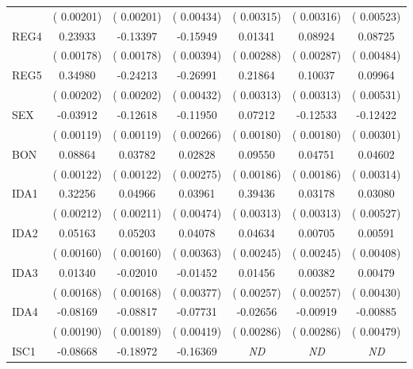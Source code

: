 {\begin{center}
\begin{table}
\begin{threeparttable}
\begin{tabular}{lcccccc}
        & \tiny{( 0.00201)} & \tiny{( 0.00201)} & \tiny{( 0.00434)} & \tiny{( 0.00315)} & \tiny{( 0.00316)} & \tiny{( 0.00523)} \\
        REG4 &  0.23933 & -0.13397 & -0.15949 &  0.01341 &  0.08924 &  0.08725 \\
        & \tiny{( 0.00178)} & \tiny{( 0.00178)} & \tiny{( 0.00394)} & \tiny{( 0.00288)} & \tiny{( 0.00287)} & \tiny{( 0.00484)} \\
        REG5 &  0.34980 & -0.24213 & -0.26991 &  0.21864 &  0.10037 &  0.09964 \\
        & \tiny{( 0.00202)} & \tiny{( 0.00202)} & \tiny{( 0.00432)} & \tiny{( 0.00313)} & \tiny{( 0.00313)} & \tiny{( 0.00531)} \\
        SEX & -0.03912 & -0.12618 & -0.11950 &  0.07212 & -0.12533 & -0.12422 \\
        & \tiny{( 0.00119)} & \tiny{( 0.00119)} & \tiny{( 0.00266)} & \tiny{( 0.00180)} & \tiny{( 0.00180)} & \tiny{( 0.00301)} \\
        BON &  0.08864 &  0.03782 &  0.02828 &  0.09550 &  0.04751 &  0.04602 \\
        & \tiny{( 0.00122)} & \tiny{( 0.00122)} & \tiny{( 0.00275)} & \tiny{( 0.00186)} & \tiny{( 0.00186)} & \tiny{( 0.00314)} \\
        IDA1 &  0.32256 &  0.04966 &  0.03961 &  0.39436 &  0.03178 &  0.03080 \\
        & \tiny{( 0.00212)} & \tiny{( 0.00211)} & \tiny{( 0.00474)} & \tiny{( 0.00313)} & \tiny{( 0.00313)} & \tiny{( 0.00527)} \\
        IDA2 &  0.05163 &  0.05203 &  0.04078 &  0.04634 &  0.00705 &  0.00591 \\
        & \tiny{( 0.00160)} & \tiny{( 0.00160)} & \tiny{( 0.00363)} & \tiny{( 0.00245)} & \tiny{( 0.00245)} & \tiny{( 0.00408)} \\
        IDA3 &  0.01340 & -0.02010 & -0.01452 &  0.01456 &  0.00382 &  0.00479 \\
        & \tiny{( 0.00168)} & \tiny{( 0.00168)} & \tiny{( 0.00377)} & \tiny{( 0.00257)} & \tiny{( 0.00257)} & \tiny{( 0.00430)} \\
        IDA4 & -0.08169 & -0.08817 & -0.07731 & -0.02656 & -0.00919 & -0.00885 \\
        & \tiny{( 0.00190)} & \tiny{( 0.00189)} & \tiny{( 0.00419)} & \tiny{( 0.00286)} & \tiny{( 0.00286)} & \tiny{( 0.00479)} \\
        ISC1 & -0.08668 & -0.18972 & -0.16369 & \textit{ND} & \textit{ND} & \textit{ND} \\

\end{tabular}
\end{threeparttable}
\end{table}
\end{center}}
